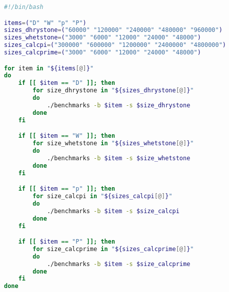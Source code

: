 \begin{lstlisting}[language=bash,frame=single,caption={Código fuente para automatizar las ejecuciones en el simulador Gem5},showstringspaces=false,label=lst:deploy-sh-sim]
#!/bin/bash

items=("D" "W" "p" "P")
sizes_dhrystone=("60000" "120000" "240000" "480000" "960000")
sizes_whetstone=("3000" "6000" "12000" "24000" "48000")
sizes_calcpi=("300000" "600000" "1200000" "2400000" "4800000")
sizes_calcprime=("3000" "6000" "12000" "24000" "48000")

for item in "${items[@]}"
do
    if [[ $item == "D" ]]; then
        for size_dhrystone in "${sizes_dhrystone[@]}"
        do
            ./benchmarks -b $item -s $size_dhrystone
        done
    fi

    if [[ $item == "W" ]]; then
        for size_whetstone in "${sizes_whetstone[@]}"
        do
            ./benchmarks -b $item -s $size_whetstone
        done
    fi

    if [[ $item == "p" ]]; then
        for size_calcpi in "${sizes_calcpi[@]}"
        do
            ./benchmarks -b $item -s $size_calcpi
        done
    fi

    if [[ $item == "P" ]]; then
        for size_calcprime in "${sizes_calcprime[@]}"
        do
            ./benchmarks -b $item -s $size_calcprime
        done
    fi
done
\end{lstlisting}

